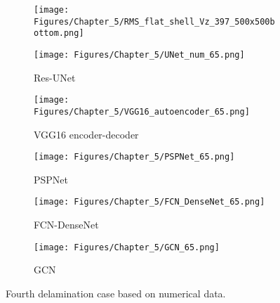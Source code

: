 \begin{figure} [!h]
	\centering
	\begin{subfigure}[b]{.48\textwidth}
		\centering
		\texttt{[image: Figures/Chapter\_5/RMS\_flat\_shell\_Vz\_397\_500x500bottom.png]}
		\caption{}
		\label{fig:RMS_bottom_397}
	\end{subfigure}
	\hfill
	\begin{subfigure}[b]{.48\textwidth}
		\centering
		\texttt{[image: Figures/Chapter\_5/UNet\_num\_65.png]}
		\caption{Res-UNet}
		\label{fig:unet_65}	
	\end{subfigure}
	\hfill
	\begin{subfigure}[b]{.48\textwidth}
		\centering
		\texttt{[image: Figures/Chapter\_5/VGG16\_autoencoder\_65.png]}
		\caption{VGG16 encoder-decoder}
		\label{fig:vgg16_65}
	\end{subfigure}
	\hfill
	\begin{subfigure}[b]{.48\textwidth}
		\centering
		\texttt{[image: Figures/Chapter\_5/PSPNet\_65.png]}
		\caption{PSPNet}
		\label{fig:pspnet_65}	
	\end{subfigure}
	\hfill
	\begin{subfigure}[b]{.48\textwidth}
		\centering
		\texttt{[image: Figures/Chapter\_5/FCN\_DenseNet\_65.png]}
		\caption{FCN-DenseNet}
		\label{fig:densenet_65}
	\end{subfigure}
	\hfill
	\begin{subfigure}[b]{.48\textwidth}
		\centering
		\texttt{[image: Figures/Chapter\_5/GCN\_65.png]}
		\caption{GCN}
		\label{fig:gcn_65}	
	\end{subfigure}
	\caption{Fourth delamination case based on numerical data.}
	\label{fig:rms_fourth_case}
\end{figure}
\clearpage

